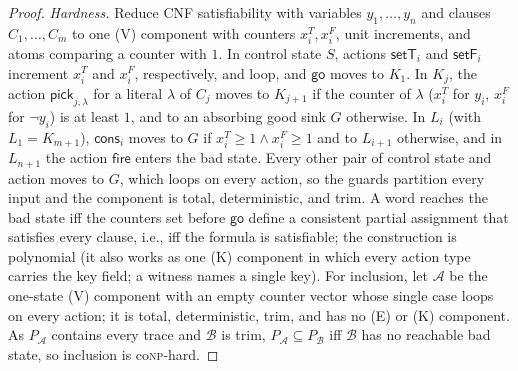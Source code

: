 \begin{proof}
\emph{Hardness.} Reduce CNF satisfiability with variables $y_1,\ldots,y_n$ and clauses $C_1,\ldots,C_m$ to one (V) component with
counters $x^T_i,x^F_i$, unit increments, and atoms comparing a counter with $1$. In control state $S$, actions $\mathsf{setT}_i$ and
$\mathsf{setF}_i$ increment $x^T_i$ and $x^F_i$, respectively, and loop, and $\mathsf{go}$ moves to $K_1$. In $K_j$, the action $\mathsf{pick}_{j,\lambda}$ for
a literal $\lambda$ of $C_j$ moves to $K_{j+1}$ if the counter of $\lambda$ ($x^T_i$ for $y_i$, $x^F_i$ for $\neg y_i$) is at least $1$, and to
an absorbing good sink $G$ otherwise. In $L_i$ (with $L_1=K_{m+1}$), $\mathsf{cons}_i$ moves to $G$ if $x^T_i\ge1\wedge x^F_i\ge1$ and to
$L_{i+1}$ otherwise, and in $L_{n+1}$ the action $\mathsf{fire}$ enters the bad state. Every other pair of control state and action moves
to $G$, which loops on every action, so the guards partition every input and the component is total, deterministic, and trim. A word
reaches the bad state iff the counters set before $\mathsf{go}$ define a consistent partial assignment that satisfies every clause, i.e.,
iff the formula is satisfiable; the construction is polynomial (it also works as one (K) component in which every action type carries the key field; a witness names a single key).
For inclusion, let $\mathcal A$ be the one-state (V) component with an empty counter vector whose single case loops on every
action; it is total, deterministic, trim, and has no (E) or (K) component. As $P_{\mathcal A}$ contains every trace and $\mathcal B$ is trim,
$P_{\mathcal A}\subseteq P_{\mathcal B}$ iff $\mathcal B$ has no reachable bad state, so inclusion is co\textsc{np}-hard.
\end{proof}


 
